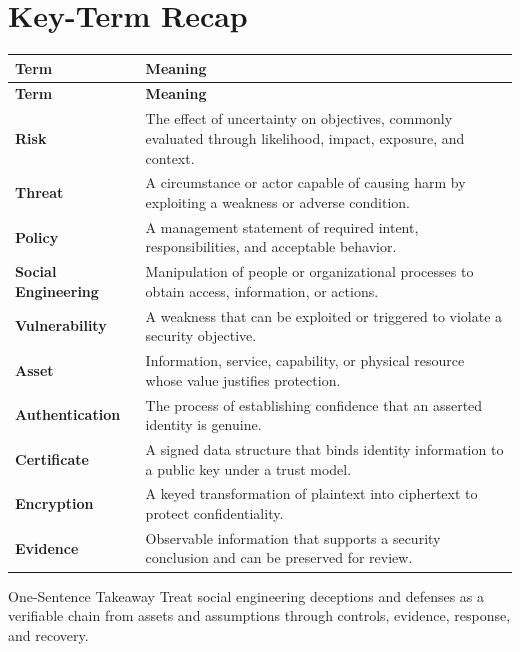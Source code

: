 \documentclass[11pt,letterpaper]{article}
\begin{document}
\section*{Key-Term Recap}
\begin{longtable}{>{\raggedright\arraybackslash}p{}>{\raggedright\arraybackslash}p{}}
\toprule\rowcolor{Navy}\color{white}\textbf{Term} & \color{white}\textbf{Meaning}\\\midrule
\endfirsthead
\toprule\rowcolor{Navy}\color{white}\textbf{Term} & \color{white}\textbf{Meaning}\\\midrule
\endhead
\textbf{Risk} & The effect of uncertainty on objectives, commonly evaluated through likelihood, impact, exposure, and context. \\\midrule
\textbf{Threat} & A circumstance or actor capable of causing harm by exploiting a weakness or adverse condition. \\\midrule
\textbf{Policy} & A management statement of required intent, responsibilities, and acceptable behavior. \\\midrule
\textbf{Social Engineering} & Manipulation of people or organizational processes to obtain access, information, or actions. \\\midrule
\textbf{Vulnerability} & A weakness that can be exploited or triggered to violate a security objective. \\\midrule
\textbf{Asset} & Information, service, capability, or physical resource whose value justifies protection. \\\midrule
\textbf{Authentication} & The process of establishing confidence that an asserted identity is genuine. \\\midrule
\textbf{Certificate} & A signed data structure that binds identity information to a public key under a trust model. \\\midrule
\textbf{Encryption} & A keyed transformation of plaintext into ciphertext to protect confidentiality. \\\midrule
\textbf{Evidence} & Observable information that supports a security conclusion and can be preserved for review. \\\midrule
\bottomrule
\end{longtable}
\begin{CornellExamBox}{One-Sentence Takeaway}
Treat social engineering deceptions and defenses as a verifiable chain from assets and assumptions through controls, evidence, response, and recovery.
\end{CornellExamBox}
\end{document}
